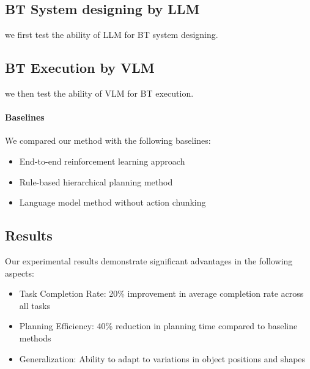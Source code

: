\documentclass{article}
\begin{document}
\subsection{BT System designing by LLM}



we first test the ability of LLM for BT system designing.




\subsection{BT Execution by VLM}

we then test the ability of VLM for BT execution.


\paragraph{Baselines}

We compared our method with the following baselines:

\begin{itemize}
    \item End-to-end reinforcement learning approach
    \item Rule-based hierarchical planning method
    \item Language model method without action chunking
\end{itemize}

\subsection{Results}

Our experimental results demonstrate significant advantages in the following aspects:

\begin{itemize}
    \item Task Completion Rate: 20\% improvement in average completion rate across all tasks
    \item Planning Efficiency: 40\% reduction in planning time compared to baseline methods
    \item Generalization: Ability to adapt to variations in object positions and shapes
\end{itemize}
\end{document}
